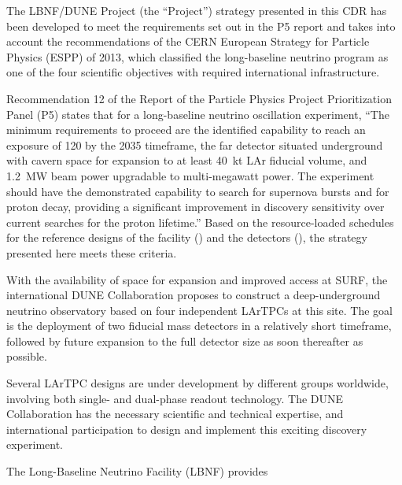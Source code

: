 The LBNF/DUNE Project (the ``Project'') strategy presented in this CDR has been developed to meet the requirements 
set out in the P5 report and %
takes into account the recommendations of the CERN European Strategy for Particle 
Physics (ESPP) of 2013, which classified the long-baseline neutrino program as 
one of the four scientific objectives with required international infrastructure.

Recommendation 12 of the Report of the Particle Physics Project Prioritization Panel (P5) 
states that for a long-baseline neutrino oscillation experiment, ``The 
minimum requirements to proceed are the identified capability to reach an exposure 
of \num{120}\ktMWyr{} by the 2035 timeframe, the far detector situated underground 
with cavern space for expansion to at least 40~kt LAr fiducial volume, and 1.2~MW 
beam power upgradable to multi-megawatt power. The experiment should have the demonstrated 
capability to search for supernova bursts and for proton decay, providing a significant 
improvement in discovery sensitivity over current searches for the proton lifetime.'' 
Based on the resource-loaded schedules for the reference designs of the facility (\vollbnf)
and the detectors (\voldune), the strategy presented here meets these criteria. 

With the availability of space for expansion and improved access at SURF, %
the international DUNE Collaboration proposes to construct a deep-underground neutrino observatory based on four independent  LArTPCs at this site. %
The goal is the deployment of two  fiducial mass detectors in a relatively short timeframe, followed by future expansion to the full detector size as soon thereafter as possible. 

Several LArTPC designs are under development by different groups worldwide, involving both single- and dual-phase readout technology.
The DUNE %
Collaboration has the necessary scientific and technical expertise, %
and international participation  to design and implement this exciting discovery experiment. 

The Long-Baseline Neutrino Facility (LBNF) provides

